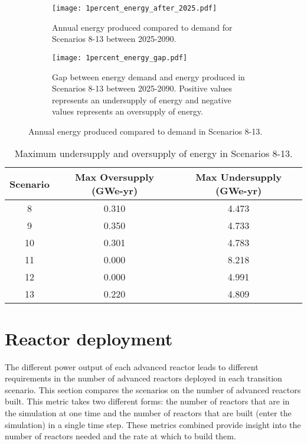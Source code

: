 \begin{figure}
    \centering
    \begin{subfigure}[b]{0.45\textwidth}
        \centering
        \texttt{[image: 1percent\_energy\_after\_2025.pdf]}
        \caption{Annual energy produced compared to demand for Scenarios 8-13
        between 2025-2090.}
        \label{fig:1percent_energy_after_2025}
    \end{subfigure}
    \hfill
    \begin{subfigure}[b]{0.45\textwidth}
        \centering
        \texttt{[image: 1percent\_energy\_gap.pdf]}
        \caption{Gap between energy demand and energy produced in Scenarios 8-13
        between 2025-2090. Positive values represents an undersupply of energy 
        and negative values represents an oversupply of energy. }
        \label{fig:1percent_energy_gap}
    \end{subfigure}
       \caption{Annual energy produced compared to demand in Scenarios 8-13.}
       \label{fig:1percent_energy}
\end{figure}

\begin{table}
    \centering
    \caption{Maximum undersupply and oversupply of energy in Scenarios 8-13.}
    \label{tab:1percent_energy}
    \begin{tabular}{c c c}
        \hline 
        Scenario & Max Oversupply (GWe-yr) & Max Undersupply (GWe-yr) \\
        \hline 
        8 & 0.310 & 4.473 \\
        9 & 0.350 & 4.733 \\
        10 & 0.301 & 4.783 \\
        11 & 0.000 & 8.218 \\
        12 & 0.000 & 4.991 \\
        13 & 0.220 & 4.809\\
        \hline
        
    \end{tabular}
\end{table}

\section{Reactor deployment}
The different power output of each advanced reactor leads to different 
requirements in the number of advanced reactors deployed in each transition 
scenario. 
This section compares the scenarios on the number of advanced reactors 
built. This metric takes two 
different forms: the number of reactors that are in the simulation at 
one time and the number of reactors that are built (enter the simulation)
in a single time step. These metrics combined provide insight into the 
number of reactors needed and the rate at which to build them. 

